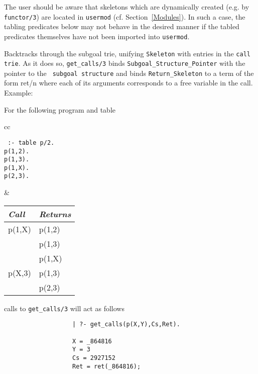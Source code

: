 The user should be aware that skeletons which are dynamically created
(e.g. by {\tt functor/3}) are located in {\tt usermod}
(cf. Section~\ref{Modules}).  In such a case, the tabling predicates
below may not behave in the desired manner if the tabled predicates
themselves have not been imported into {\tt usermod}.

\begin{description}

Backtracks through the subgoal trie, unifying {\tt Skeleton} with
entries in the {\tt call trie}.  As it does so, {\tt get\_calls/3}
binds {\tt Subgoal\_Structure\_Pointer} with the pointer to the {\tt
subgoal structure} and binds {\tt Return\_Skeleton} to a term of the
form ret/n where each of its arguments corresponds to a free variable
in the call.  Example:

For the following program and table
     \begin{center}
     \begin{tabular}{cc}
     \begin{minipage}{1.1in}
     {\tt
          :- table p/2.	\\
          p(1,2).       \\
          p(1,3).       \\
          p(1,X).       \\
          p(2,3). 
     }
     \end{minipage}
     &
     \begin{tabular}{||l|l||}   \hline
     {\em Call}			& {\em Returns} \\ \hline \hline
     p(1,X)			& p(1,2) \\ 
 	       			& p(1,3) \\
                                & p(1,X) \\ \hline
     p(X,3)			& p(1,3) \\ 
 	       			& p(2,3) \\ \hline
     \end{tabular}
     \end{tabular}
     \end{center}
calls to {\tt get\_calls/3} will act as follows
	{\footnotesize
	\begin{verbatim}
                   | ?- get_calls(p(X,Y),Cs,Ret).

                   X = _864816
                   Y = 3
                   Cs = 2927152
                   Ret = ret(_864816);


\end{verbatim}}
\end{description}
